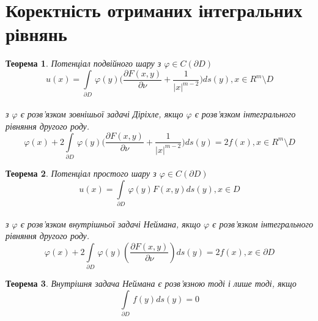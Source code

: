 \documentclass[a4 paper,12pt,ukrainian]{report}
\newtheorem{theorem}{\textbf{Теорема}}[chapter]
\begin{document}
\section{Коректність отриманих інтегральних рівнянь}
\begin{theorem}
Потенціал подвійного шару з $\varphi \in C(\partial D)$
\begin{equation*}
u(x) = \int\limits_{\partial D} \, \varphi(y) \bigg(\frac{\partial F(x,y)}{\partial \nu} + \frac{1}{|x|^{m-2}}\bigg)ds(y), x \in R^m \setminus D
\end{equation*}
\\ з $\varphi$ є розв'язком зовнішьої задачі Діріхле, якщо $\varphi$ є розв'язком інтегрального рівняння другого роду.
\begin{equation}
\varphi(x) + 2\int\limits_{\partial D} \, \varphi(y) \bigg(\frac{\partial F(x,y)}{\partial \nu} + \frac{1}{|x|^{m-2}}\bigg)ds(y) = 2f(x), x \in R^m \setminus D
\end{equation}
\end{theorem}


\begin{theorem}
Потенціал простого шару з $\varphi \in C(\partial D)$
\begin{equation*}
u(x) = \int\limits_{\partial D} \, \varphi(y) F(x,y)ds(y), x \in  D
\end{equation*}
\\ з $\varphi$ є розв'язком внутрішньої задачі Неймана, якщо $\varphi$ є розв'язком інтегрального рівняння другого роду.
\begin{equation}
\varphi(x) + 2\int\limits_{\partial D} \, \varphi(y) (\frac{\partial F(x,y)}{\partial \nu})ds(y) = 2f(x), x \in \partial D
\end{equation}
\end{theorem}
\begin{theorem}
Внутрішня задача Неймана є розв'язною тоді і лише тоді, якщо
\begin{equation*}
\int\limits_{\partial D} \, f(y)ds(y) = 0
\end{equation*}
\end{theorem}
\end{document}
